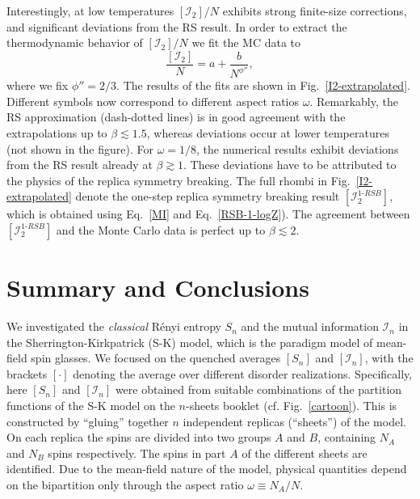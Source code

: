 \documentclass[twocolumn,superscriptaddress,prb,10pt]{revtex4-1}
\begin{document}
Interestingly, at low temperatures $[{\mathcal I}_2]/N$ exhibits strong finite-size corrections, 
and significant deviations from the RS result. In order to extract the thermodynamic behavior of 
$[{\mathcal I}_2]/N$ we fit the MC data to 
%
\begin{equation}
\frac{[{\mathcal I}_2]}{N}=a+\frac{b}{N^{\phi''}},
\end{equation}
%
where we fix $\phi''=2/3$. The results of the fits are shown in Fig.~\ref{I2-extrapolated}.  
Different symbols now correspond to different aspect ratios $\omega$. Remarkably, the RS 
approximation (dash-dotted lines) is 
in good agreement with the extrapolations up to $\beta\lesssim 1.5$, whereas deviations 
occur at lower temperatures (not shown in the figure). 
For $\omega=1/8$, the numerical results exhibit deviations from the RS result already at $\beta\gtrsim 1$. 
These deviations have to be attributed to the physics of the replica symmetry breaking. 
The full rhombi in Fig.~\ref{I2-extrapolated} denote the one-step replica symmetry breaking result 
$[{\mathcal I}_2^{1\textrm{-}RSB}]$, which is obtained using Eq.~\eqref{MI} and Eq.~\eqref{RSB-1-logZ}). 
The agreement between $[{\mathcal I}_2^{1\textrm{-}RSB}]$ and the Monte Carlo data is perfect 
up to $\beta\lesssim 2$. 
 


\section{Summary and Conclusions}
\label{conclusions}

We investigated the \emph{classical} R\'enyi entropy $S_n$ and the mutual information 
${\mathcal I}_n$ in the Sherrington-Kirkpatrick (S-K) model, which is the paradigm model 
of mean-field spin glasses. We focused on the quenched 
averages $[S_n]$ and $[{\mathcal I}_n]$, with the brackets $[\cdot]$ denoting the average 
over different disorder realizations. Specifically, here $[S_n]$ and $[{\mathcal I}_n]$ 
were obtained from suitable combinations of the partition functions of the S-K model on the 
$n$-sheets booklet (cf. Fig.~\ref{cartoon}). This is constructed by ``gluing'' together 
$n$ independent replicas (``sheets'') of the model. On each replica the spins are 
divided into two groups $A$ and $B$, containing $N_A$ and $N_B$ spins respectively. The 
spins in part $A$ of the different sheets are identified. Due to the mean-field nature of 
the model, physical quantities depend on the bipartition only through the aspect ratio 
$\omega\equiv N_A/N$. 
\end{document}
